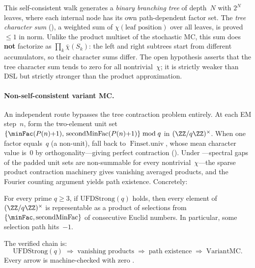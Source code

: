 This self-consistent walk generates a \emph{binary branching tree}
of depth~$N$ with $2^N$ leaves, where each internal node has its own
path-dependent factor set.  The \emph{tree character sum}
(),
a weighted sum of $\chi(\text{leaf position})$ over all leaves, is proved
$\leq 1$ in norm.  Unlike the product multiset of the stochastic MC, this sum
does \textbf{not} factorize as $\prod_k \bar\chi(S_k)$: the left and
right subtrees start from different accumulators, so their character sums
differ.  The open hypothesis
asserts that the tree character sum tends to zero for all nontrivial~$\chi$;
it is strictly weaker than DSL but strictly stronger than the product approximation.

\paragraph{Non-self-consistent variant MC.}
An independent route bypasses the tree contraction problem entirely.
At each EM step~$n$, form the two-element unit set
$\{\minFac(P(n){+}1),\, \operatorname{secondMinFac}(P(n){+}1)\} \bmod q$
in $(\ZZ/q\ZZ)^\times$.  When one factor equals~$q$
(a non-unit), fall back to $\operatorname{Finset.univ}$, whose
mean character value is~$0$ by orthogonality---giving perfect contraction
().
Under ---spectral gaps of the padded unit sets
are non-summable for every nontrivial~$\chi$---the
sparse product contraction machinery gives vanishing averaged
products, and the Fourier counting argument yields
path existence.  Concretely:

\begin{theorem}
\label{thm:variant-mc}
For every prime $q \geq 3$, if $\mathrm{UFDStrong}(q)$ holds, then
every element of $(\ZZ/q\ZZ)^\times$ is representable as a product
of selections from $\{\minFac,\operatorname{secondMinFac}\}$ of
consecutive Euclid numbers.  In particular, some selection path
hits~$-1$.
\end{theorem}

The verified chain is:
\[
  \mathrm{UFDStrong}(q)
  \;\Longrightarrow\;
  \text{vanishing products}
  \;\Longrightarrow\;
  \text{path existence}
  \;\Longrightarrow\;
  \text{VariantMC}.
\]
Every arrow is machine-checked with zero .

